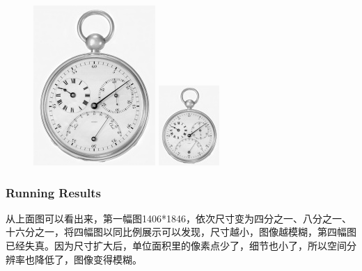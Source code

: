 \documentclass[notheorems,serif,table,compress]{beamer}  %
\begin{document}
\begin{frame}
\begin{figure}
\begin{minipage}[t]{0.4\linewidth}
        \end{minipage}
        \begin{minipage}[t]{0.4\linewidth}
        \centering
        \includegraphics[width=0.7\linewidth]{150dpi.jpg} 
        \end{minipage}
        \begin{minipage}[t]{0.4\linewidth}
        \centering
        \includegraphics[width=0.7\linewidth]{72dpi.jpg} 
        \end{minipage}
    \end{figure}
\end{frame}
\begin{frame}
\frametitle{Running Results}
  从上面图可以看出来，第一幅图1406*1846，依次尺寸变为四分之一、八分之一、十六分之一，将四幅图以同比例展示可以发现，尺寸越小，图像越模糊，第四幅图已经失真。因为尺寸扩大后，单位面积里的像素点少了，细节也小了，所以空间分辨率也降低了，图像变得模糊。
\end{frame}
\end{document}
